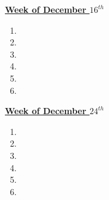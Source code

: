 \documentclass[11pt]{article}
\newcommand{\comments}[1]{}
\begin{document}
           {\small \underline{\textbf{Week of December $16^{th}$}} }\\
           \begin{enumerate} 
             \small \item \small
           \item \small 
           \item \small
           \item \small 
           \item \small
           \item \small 
           \end{enumerate} 
\comments{
     {\small \underline{\textbf{Weekend of December $20^{th}$}} }\\
     \begin{enumerate} 
       \small \item \small 
     \item \small 
     \item \small
     \item \small 
     \item \small
      \item \small 
      \item \small   
     \end{enumerate}
     }
     {\small \underline{\textbf{Week of December $24^{th}$}} }\\
      \begin{enumerate}
        \small \item \small 
      \item \small
      \item \small 
      \item \small 
      \item \small 
      \item \small          
      \end{enumerate}
      \newpage
\end{document}
